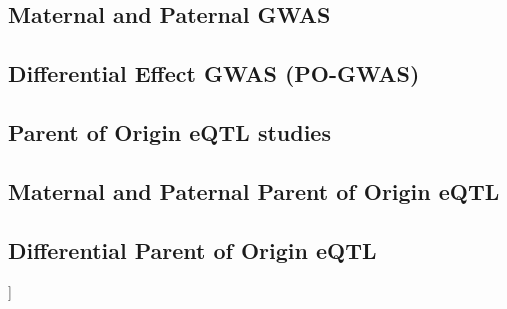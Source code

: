 \subsection{Maternal and Paternal GWAS}\label{Maternal and Paternal GWAS}

\subsection{Differential Effect GWAS (PO-GWAS)}\label{Differential Effect GWAS (PO-GWAS)}

\subsection{Parent of Origin eQTL studies}\label{Parent of Origin eQTL studies}

\subsection{Maternal and Paternal Parent of Origin eQTL}\label{Maternal and Paternal Parent of Origin Parent of Origin eQTL}

\subsection{Differential Parent of Origin eQTL}\label{Differential Parent of Origin eQTL}





]









